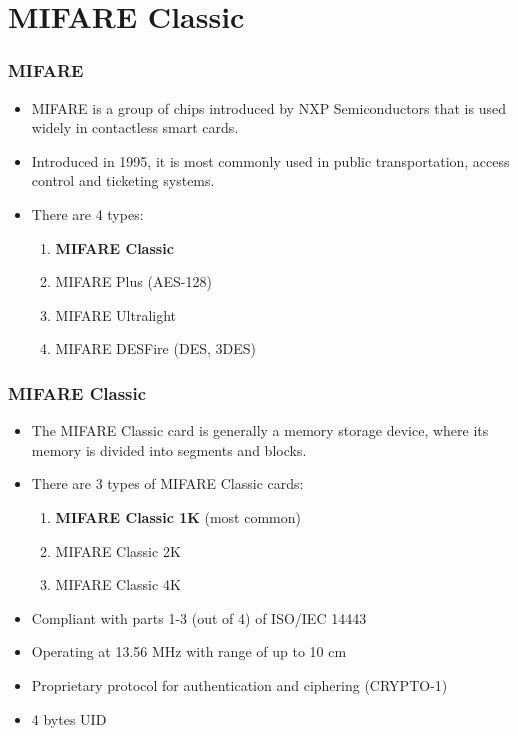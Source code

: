 \documentclass[12pt]{beamer}
\begin{document}
\section{MIFARE Classic}
\begin{frame}
\frametitle{MIFARE}
\begin{itemize}
	\item MIFARE is a group of chips introduced by NXP Semiconductors that is used widely in contactless smart cards.
	\item Introduced in 1995, it is most commonly used in public transportation, access control and ticketing systems.
	\item There are 4 types:
	\begin{enumerate}
		\item \textbf{MIFARE Classic}
		\item MIFARE Plus (AES-128)
		\item MIFARE Ultralight
		\item MIFARE DESFire (DES, 3DES)
	\end{enumerate}
\end{itemize}
\end{frame}

\begin{frame}
\frametitle{MIFARE Classic}
\begin{itemize}
	\item The MIFARE Classic card is generally a memory storage device, where its memory is divided into segments and blocks.
	\item There are 3 types of MIFARE Classic cards:
	\begin{enumerate}
		\item \textbf{MIFARE Classic 1K} (most common)
		\item MIFARE Classic 2K
		\item MIFARE Classic 4K
	\end{enumerate}
	\item Compliant with parts 1-3 (out of 4) of ISO/IEC 14443
	\item Operating at 13.56 MHz with range of up to 10 cm
	\item Proprietary protocol for authentication and ciphering (CRYPTO-1)
	\item 4 bytes UID
\end{itemize}
\end{frame}
\end{document}
